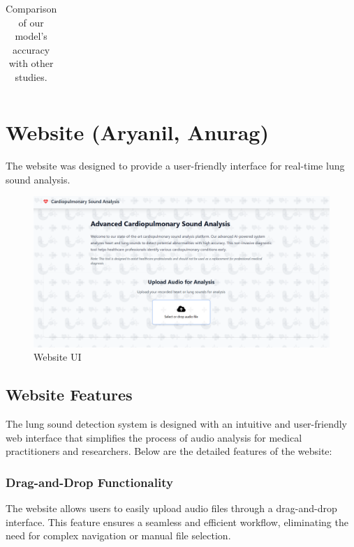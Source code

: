 \documentclass[conference]{IEEEtran}
\begin{document}
{\begin{table}[h!]
\begin{tabular}{|c|c|c|}
\end{tabular}
\caption{Comparison of our model's accuracy with other studies.}
\label{tab:accuracy_comparison}
\end{table}









\section{Website (Aryanil, Anurag)}
The website was designed to provide a user-friendly interface for real-time lung sound analysis.

\begin{figure}[h]
    \centering
    \includegraphics[width=1\linewidth]{Images/website.png}
    \caption{Website UI}
    \label{fig:enter-label}
\end{figure}

\subsection{Website Features}
The lung sound detection system is designed with an intuitive and user-friendly web interface that simplifies the process of audio analysis for medical practitioners and researchers. Below are the detailed features of the website:

\subsubsection{Drag-and-Drop Functionality}
The website allows users to easily upload audio files through a drag-and-drop interface. This feature ensures a seamless and efficient workflow, eliminating the need for complex navigation or manual file selection.

}
\end{document}
